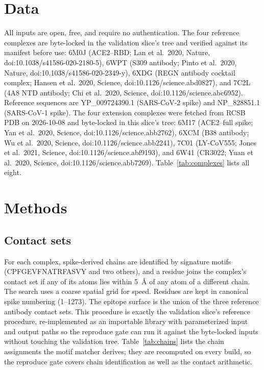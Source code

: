 \documentclass[11pt]{article}
\begin{document}
\section{Data}
\begin{sloppypar}
All inputs are open, free, and require no authentication. The four reference complexes are byte-locked in the validation slice's tree and verified against its manifest before use: 6M0J (ACE2--RBD; Lan et al.\ 2020, Nature, doi:10.1038/s41586-020-2180-5), 6WPT (S309 antibody; Pinto et al.\ 2020, Nature, doi:10.1038/s41586-020-2349-y), 6XDG (REGN antibody cocktail complex; Hansen et al.\ 2020, Science, doi:10.1126/science.abd0827), and 7C2L (4A8 NTD antibody; Chi et al.\ 2020, Science, doi:10.1126/science.abc6952). Reference sequences are YP\_009724390.1 (SARS-CoV-2 spike) and NP\_828851.1 (SARS-CoV-1 spike). The four extension complexes were fetched from RCSB PDB on 2026-10-08 and byte-locked in this slice's tree: 6M17 (ACE2--full spike; Yan et al.\ 2020, Science, doi:10.1126/science.abb2762), 6XCM (B38 antibody; Wu et al.\ 2020, Science, doi:10.1126/science.abb2241), 7C01 (LY-CoV555; Jones et al.\ 2021, Science, doi:10.1126/science.abf9193), and 6W41 (CR3022; Yuan et al.\ 2020, Science, doi:10.1126/science.abb7269). Table~\ref{tab:complexes} lists all eight.
\end{sloppypar}

\section{Methods}
\subsection{Contact sets}
For each complex, spike-derived chains are identified by signature motifs (CPFGEVFNATRFASVY and two others), and a residue joins the complex's contact set if any of its atoms lies within 5~\AA{} of any atom of a different chain. The search uses a coarse spatial grid for speed. Residues are kept in canonical spike numbering (1--1273). The epitope surface is the union of the three reference antibody contact sets. This procedure is exactly the validation slice's reference procedure, re-implemented as an importable library with parameterized input and output paths so the reproduce gate can run it against the byte-locked inputs without touching the validation tree. Table~\ref{tab:chains} lists the chain assignments the motif matcher derives; they are recomputed on every build, so the reproduce gate covers chain identification as well as the contact arithmetic.
\end{document}
